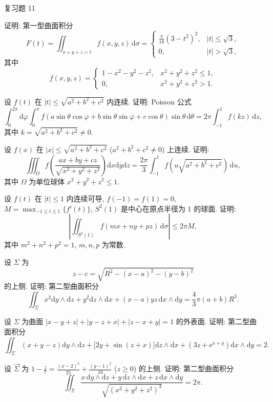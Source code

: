 \begin{exblock}{复习题 11}
\item 证明: 第一型曲面积分
\[
F(t)=\iint_{x+y+z=t}f(x,y,z)\,\mathrm{d}\sigma=\begin{cases}
\frac{\pi}{18}(3-t^{2})^{2}, & |t|\leqslant\sqrt{3},\\
0, & |t|>\sqrt{3},
\end{cases}
\]
其中
\[
f(x,y,z)=\begin{cases}
1-x^{2}-y^{2}-z^{2}, & x^{2}+y^{2}+z^{2}\leqslant1,\\
0, & x^{2}+y^{2}+z^{2}>1.
\end{cases}
\]

\item 设 $f(t)$ 在 $|t|\leqslant\sqrt{a^{2}+b^{2}+c^{2}}$ 内连续. 证明: Poisson 公式
\[
\int_{0}^{2\pi}\mathrm{d}\varphi\int_{0}^{\pi}f(a\sin\theta\cos\varphi+b\sin\theta\sin\varphi+c\cos\theta)\sin\theta\,\mathrm{d}\theta=2\pi\int_{-1}^{1}f(kz)\,\mathrm{d}z,
\]
其中 $k=\sqrt{a^{2}+b^{2}+c^{2}}\neq0$.

\item 设 $f(x)$ 在 $|x|\leqslant\sqrt{a^{2}+b^{2}+c^{2}}$ ($a^{2}+b^{2}+c^{2}\neq0$) 上连续. 证明:
\[
\iiint_{\Omega}f\left(\frac{ax+by+cz}{\sqrt{x^{2}+y^{2}+z^{2}}}\right)\mathrm{d}x\mathrm{d}y\mathrm{d}z=\frac{2\pi}{3}\int_{-1}^{1}f(u\sqrt{a^{2}+b^{2}+c^{2}})\,\mathrm{d}u,
\]
其中 $\Omega$ 为单位球体 $x^{2}+y^{2}+z^{2}\leqslant1$.

\item 设 $f(t)$ 在 $|t|\leqslant1$ 内连续可导, $f(-1)=f(1)=0$, $M=\max_{-1\leqslant t\leqslant1}\{f'(t)\}$, $S^{2}(1)$ 是中心在原点半径为 1 的球面. 证明:
\[
\left|\iint_{S^{2}(1)}f(mx+ny+pz)\,\mathrm{d}\sigma\right|\leqslant2\pi M,
\]
其中 $m^{2}+n^{2}+p^{2}=1$, $m,n,p$ 为常数.

\item 设 $\Sigma$ 为
\[
z-c=\sqrt{R^{2}-(x-a)^{2}-(y-b)^{2}}
\]
的上侧. 证明: 第二型曲面积分
\[
\iint_{\Sigma}x^{2}\mathrm{d}y\wedge\mathrm{d}z+y^{2}\mathrm{d}z\wedge\mathrm{d}x+(x-a)yz\,\mathrm{d}x\wedge\mathrm{d}y=\frac{4}{3}\pi(a+b)R^{3}.
\]

\item 设 $\Sigma$ 为曲面 $|x-y+z|+|y-z+x|+|z-x+y|=1$ 的外表面. 证明: 第二型曲面积分
\[
\iint_{\Sigma}(x+y-z)\mathrm{d}y\wedge\mathrm{d}z+\bigl[2y+\sin(z+x)\bigr]\mathrm{d}z\wedge\mathrm{d}x+(3z+\mathrm{e}^{x+y})\mathrm{d}x\wedge\mathrm{d}y=2.
\]

\item 设 $\overrightarrow{\Sigma}$ 为 $1-\frac{z}{7}=\frac{(x-2)^{2}}{25}+\frac{(y-1)^{2}}{16}$ ($z\geqslant0$) 的上侧. 证明: 第二型曲面积分
\[
\iint_{\Sigma}\frac{x\,\mathrm{d}y\wedge\mathrm{d}z+y\,\mathrm{d}z\wedge\mathrm{d}x+z\,\mathrm{d}x\wedge\mathrm{d}y}{\sqrt{(x^{2}+y^{2}+z^{2})^{3}}}=2\pi.
\]
\end{exblock}
